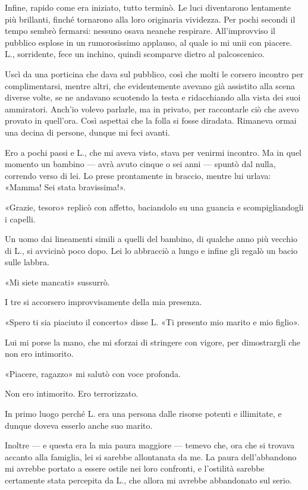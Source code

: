 \documentclass[a4paper,11pt,oneside,openright,final]{memoir}
\begin{document}
Infine, rapido come era iniziato, tutto terminò. Le luci diventarono lentamente
più brillanti, finché tornarono alla loro originaria vividezza. Per pochi
secondi il tempo sembrò fermarsi: nessuno osava neanche respirare.
All'improvviso il pubblico esplose in un rumorosissimo applauso, al quale io mi
unii con piacere. L., sorridente, fece un inchino, quindi scomparve dietro al
palcoscenico.

Uscì da una porticina che dava sul pubblico, così che molti le corsero incontro
per complimentarsi, mentre altri, che evidentemente avevano già assistito alla
scena diverse volte, se ne andavano scuotendo la testa e ridacchiando alla vista
dei suoi ammiratori. Anch'io volevo parlarle, ma in privato, per raccontarle ciò
che avevo provato in quell'ora. Così aspettai che la folla si fosse diradata.
Rimaneva ormai una decina di persone, dunque mi feci avanti.

Ero a pochi passi e L., che mi aveva visto, stava per venirmi incontro. Ma in
quel momento un bambino --- avrà avuto cinque o sei anni --- spuntò dal nulla,
correndo verso di lei. Lo prese prontamente in braccio, mentre lui urlava:
«Mamma! Sei stata bravissima!».

«Grazie, tesoro» replicò con affetto, baciandolo su una guancia e
scompigliandogli i capelli.

Un uomo dai lineamenti simili a quelli del bambino, di qualche anno più vecchio
di L., si avvicinò poco dopo. Lei lo abbracciò a lungo e infine gli regalò un
bacio sulle labbra.

«Mi siete mancati» sussurrò.

I tre si accorsero improvvisamente della mia presenza.

«Spero ti sia piaciuto il concerto» disse L. «Ti presento mio marito e mio
figlio».

Lui mi porse la mano, che mi sforzai di stringere con vigore, per dimostrargli
che non ero intimorito.

«Piacere, ragazzo» mi salutò con voce profonda.

Non ero intimorito. Ero terrorizzato.

In primo luogo perché L. era una persona dalle risorse potenti e illimitate, e
dunque doveva esserlo anche suo marito.

Inoltre --- e questa era la mia paura maggiore --- temevo che, ora che si
trovava accanto alla famiglia, lei si sarebbe allontanata da me. La paura
dell'abbandono mi avrebbe portato a essere ostile nei loro confronti, e
l'ostilità sarebbe certamente stata percepita da L., che allora mi avrebbe
abbandonato sul serio.
\end{document}
